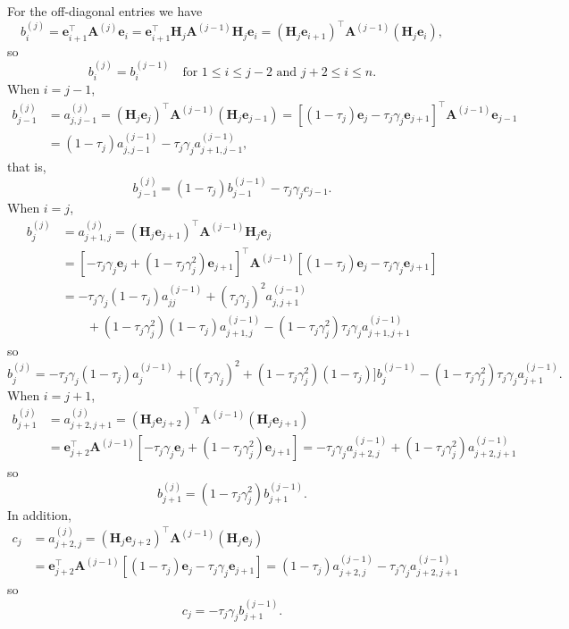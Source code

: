 \documentclass[12pt,a4paper]{article}
\newcommand{\bs}[1]{\boldsymbol{#1}}
\begin{document}
For the off-diagonal entries we have
\[
b^{(j)}_i=\bs{e}_{i+1}^\top\bs{A}^{(j)}\bs{e}_i
	=\bs{e}_{i+1}^\top\bs{H}_j\bs{A}^{(j-1)}\bs{H}_j\bs{e}_i
	=(\bs{H}_j\bs{e}_{i+1})^\top\bs{A}^{(j-1)}(\bs{H}_j\bs{e}_i),
\]
so
\[
b^{(j)}_i=b^{(j-1)}_i\quad\text{for $1\le i\le j-2$ and $j+2\le i\le n$.}
\]
When $i=j-1$,
\begin{align*}
b^{(j)}_{j-1}&=a^{(j)}_{j,j-1}
	=(\bs{H}_j\bs{e}_j)^\top\bs{A}^{(j-1)}(\bs{H}_j\bs{e}_{j-1})
	=[(1-\tau_j)\bs{e}_j-\tau_j\gamma_j\bs{e}_{j+1}]^\top
		\bs{A}^{(j-1)}\bs{e}_{j-1}\\
	&=(1-\tau_j)a^{(j-1)}_{j,j-1}-\tau_j\gamma_ja^{(j-1)}_{j+1,j-1},
\end{align*}
that is,
\[
b^{(j)}_{j-1}=(1-\tau_j)b^{(j-1)}_{j-1}-\tau_j\gamma_jc_{j-1}.
\]
When $i=j$,
\begin{align*}
b^{(j)}_j&=a^{(j)}_{j+1,j}
	=(\bs{H}_j\bs{e}_{j+1})^\top\bs{A}^{(j-1)}\bs{H}_j\bs{e}_j\\
	&=[-\tau_j\gamma_j\bs{e}_j+(1-\tau_j\gamma_j^2)\bs{e}_{j+1}]^\top
	\bs{A}^{(j-1)}[(1-\tau_j)\bs{e}_j-\tau_j\gamma_j\bs{e}_{j+1}]\\
	&=-\tau_j\gamma_j(1-\tau_j)a^{(j-1)}_{jj}
	+(\tau_j\gamma_j)^2a^{(j-1)}_{j,j+1}\\
	&\qquad{}+(1-\tau_j\gamma_j^2)(1-\tau_j)a^{(j-1)}_{j+1,j}
	-(1-\tau_j\gamma_j^2)\tau_j\gamma_ja^{(j-1)}_{j+1,j+1}
\end{align*}
so
\[
 b^{(j)}_j=-\tau_j\gamma_j(1-\tau_j)a^{(j-1)}_j
	+\bigl[(\tau_j\gamma_j)^2+(1-\tau_j\gamma_j^2)(1-\tau_j)\bigr]b^{(j-1)}_j
	-(1-\tau_j\gamma_j^2)\tau_j\gamma_ja^{(j-1)}_{j+1}.
\]
When $i=j+1$,
\begin{align*}
b^{(j)}_{j+1}&=a^{(j)}_{j+2,j+1}
	=(\bs{H}_j\bs{e}_{j+2})^\top\bs{A}^{(j-1)}(\bs{H}_j\bs{e}_{j+1})\\
	&=\bs{e}_{j+2}^\top\bs{A}^{(j-1)}
		[-\tau_j\gamma_j\bs{e}_j+(1-\tau_j\gamma_j^2)\bs{e}_{j+1}]
	=-\tau_j\gamma_ja^{(j-1)}_{j+2,j}+(1-\tau_j\gamma_j^2)a^{(j-1)}_{j+2,j+1}
\end{align*}
so
\[
b^{(j)}_{j+1}=(1-\tau_j\gamma_j^2)b^{(j-1)}_{j+1}.
\]
In addition,
\begin{align*}
c_j&=a^{(j)}_{j+2,j}
	=(\bs{H}_j\bs{e}_{j+2})^\top\bs{A}^{(j-1)}(\bs{H}_j\bs{e}_j)\\
	&=\bs{e}_{j+2}^\top\bs{A}^{(j-1)}
	[(1-\tau_j)\bs{e}_j-\tau_j\gamma_j\bs{e}_{j+1}]
	=(1-\tau_j)a^{(j-1)}_{j+2,j}-\tau_j\gamma_ja^{(j-1)}_{j+2,j+1}
\end{align*}
so
\[
c_j=-\tau_j\gamma_jb^{(j-1)}_{j+1}.
\]
\end{document}
